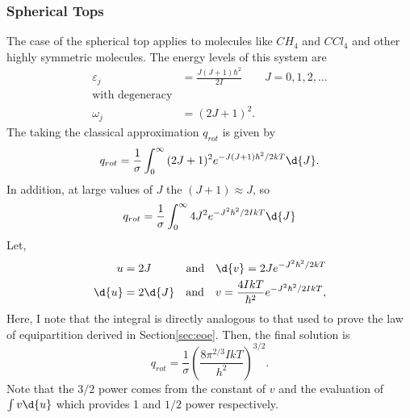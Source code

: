 \subsubsection{Spherical Tops}
The case of the spherical top applies to molecules like $CH_4$ and $CCl_4$ and
other highly symmetric molecules. The energy levels of this system are
\begin{align*}
	\varepsilon_j &= \frac{J(J+1)\hbar^2}{2I} \qquad J = 0,1,2,\ldots\\
	\text{with degeneracy}\\
	\omega_j &= (2J + 1)^2.
\end{align*}
The taking the classical approximation $q_{rot}$ is given by
\begin{equation*}
	q_{rot} = \frac{1}{\sigma}
	\int_{0}^{\infty}{(2J + 1)^2 e^{-J(J+1)\hbar^{2}/2kT}\d{J}}.
\end{equation*}
In addition, at large values of $J$ the $(J + 1) \approx J$, so
\begin{equation*}
	q_{rot} = \frac{1}{\sigma}
	\int_{0}^{\infty}{4J^2 e^{-J^2 \hbar^{2}/2IkT}\d{J}}\\
\end{equation*}
Let,
\begin{align*}
	u &= 2J &\text{and} \quad
	\d{v} = 2J e^{-J^2 \hbar^{2}/2kT}\\
	\d{u} &= 2 \d{J}  &\text{and} \quad
	v = \frac{4IkT}{\hbar^2} e^{-J^2 \hbar^{2}/2IkT},
\end{align*}
Here, I note that the integral is directly analogous to that used to prove the
law of equipartition derived in Section\ref{sec:eoe}. Then, the final solution
is
\begin{equation*}
	q_{rot} = \frac{1}{\sigma}
	{\left( \frac{8\pi^{2/3} IkT}{h^2} \right)}^{3/2}.
\end{equation*}
Note that the $3/2$ power comes from the constant of $v$ and the
evaluation of $\int{v \d{u}}$ which provides 1 and $1/2$ power
respectively.

